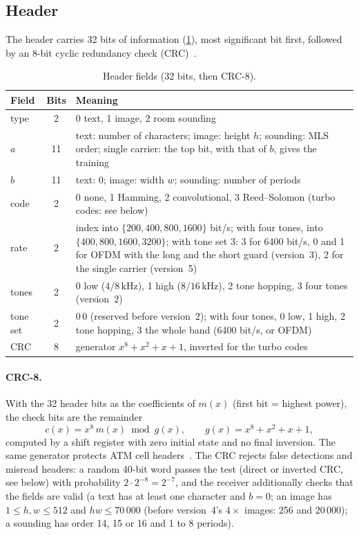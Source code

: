 \documentclass[11pt,a4paper]{article}
\newcommand{\kHz}{\,\mathrm{kHz}}
\theoremstyle{remark}
\begin{document}
\subsection{Header}
\label{sec:header}
The header carries 32 bits of information (\cref{tab:header}), most significant bit first, followed by an 8-bit cyclic redundancy check (CRC)~\cite{petersonbrown}.
\begin{table}[ht]
\centering
\caption{Header fields (32 bits, then CRC-8).}
\label{tab:header}
\begin{tabularx}{\linewidth}{lcX}
\toprule
Field & Bits & Meaning\\
\midrule
type & 2 & 0 text, 1 image, 2 room sounding\\
$a$ & 11 & text: number of characters; image: height $h$; sounding: MLS order; single carrier: the top bit, with that of $b$, gives the training\\
$b$ & 11 & text: 0; image: width $w$; sounding: number of periods\\
code & 2 & 0 none, 1 Hamming, 2 convolutional, 3 Reed--Solomon (turbo codes: see below)\\
rate & 2 & index into $\{200, 400, 800, 1600\}$ bit/s; with four tones, into $\{400, 800, 1600, 3200\}$; with tone set 3: 3 for 6400 bit/s, 0 and 1 for OFDM with the long and the short guard (version~3), 2 for the single carrier (version~5)\\
tones & 2 & 0 low ($4/8\kHz$), 1 high ($8/16\kHz$), 2 tone hopping, 3 four tones (version~2)\\
tone set & 2 & $0\,0$ (reserved before version~2); with four tones, 0 low, 1 high, 2 tone hopping, 3 the whole band (6400 bit/s, or OFDM)\\
CRC & 8 & generator $x^8 + x^2 + x + 1$, inverted for the turbo codes\\
\bottomrule
\end{tabularx}
\end{table}

\paragraph{CRC-8.}
With the 32 header bits as the coefficients of $m(x)$ (first bit = highest power), the check bits are the remainder
\begin{equation}
c(x) = x^8\, m(x) \bmod g(x), \qquad g(x) = x^8 + x^2 + x + 1,
\end{equation}
computed by a shift register with zero initial state and no final inversion. The same generator protects ATM cell headers~\cite{itui432}. The CRC rejects false detections and misread headers: a random 40-bit word passes the test (direct or inverted CRC, see below) with probability $2 \cdot 2^{-8} = 2^{-7}$, and the receiver additionally checks that the fields are valid (a text has at least one character and $b = 0$; an image has $1 \le h, w \le 512$ and $hw \le 70\,000$ (before version~4's $4\times$ images: 256 and $20\,000$); a sounding has order 14, 15 or 16 and 1 to 8 periods).
\end{document}
